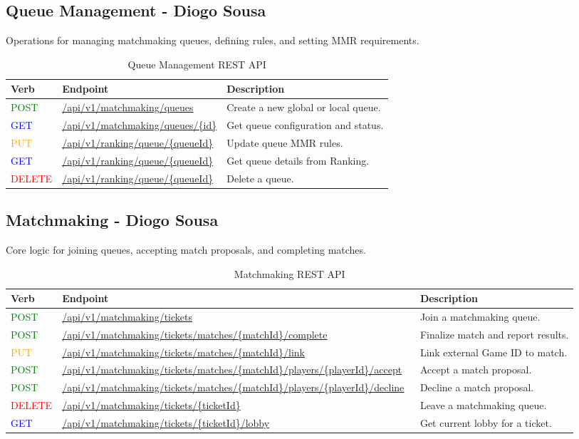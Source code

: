 \documentclass[11pt,a4paper]{article}
\newcommand{\postapi}{\textcolor{green}{POST}}
\newcommand{\getapi}{\textcolor{blue}{GET}}
\newcommand{\putapi}{\textcolor{orange}{PUT}}
\newcommand{\deleteapi}{\textcolor{red}{DELETE}}
\newcommand{\matchmaking}[1]{/api/v1/matchmaking#1}
\newcommand{\ranking}[1]{/api/v1/ranking#1}
\newcommand{\bff}[1]{\textbf{#1}}
\begin{document}
 \subsection{Queue Management - Diogo Sousa}

 Operations for managing matchmaking queues, defining rules, and setting MMR requirements.

 \begin{table}[H]
 \begin{tabular}{|p{2cm}|p{5cm}|p{7cm}|}
 \hline
 \bff{Verb} & \bff{Endpoint}     & \bff{Description} \\ \hline
 \postapi & \url{\matchmaking{/queues}}   & Create a new global or local queue. \\ \hline
 \getapi & \url{\matchmaking{/queues/{id}}} & Get queue configuration and status. \\ \hline
 \putapi & \url{\ranking{/queue/{queueId}}} & Update queue MMR rules. \\ \hline
 \getapi & \url{\ranking{/queue/{queueId}}} & Get queue details from Ranking. \\ \hline
 \deleteapi & \url{\ranking{/queue/{queueId}}} & Delete a queue. \\ \hline
 \end{tabular}
 \caption{Queue Management REST API}
 \label{tab:api-queue-management}
 \end{table}

 \subsection{Matchmaking - Diogo Sousa}

 Core logic for joining queues, accepting match proposals, and completing matches.

 \begin{table}[H]
 \begin{tabular}{|p{2cm}|p{5cm}|p{7cm}|}
 \hline
 \bff{Verb} & \bff{Endpoint}               & \bff{Description} \\ \hline
 \postapi & \url{\matchmaking{/tickets}}             & Join a matchmaking queue. \\ \hline
 \postapi & \url{\matchmaking{/tickets/matches/{matchId}/complete}}     & Finalize match and report results. \\ \hline
 \putapi & \url{\matchmaking{/tickets/matches/{matchId}/link}}      & Link external Game ID to match. \\ \hline
 \postapi & \url{\matchmaking{/tickets/matches/{matchId}/players/{playerId}/accept}}  & Accept a match proposal. \\ \hline
 \postapi & \url{\matchmaking{/tickets/matches/{matchId}/players/{playerId}/decline}} & Decline a match proposal. \\ \hline
 \deleteapi & \url{\matchmaking{/tickets/{ticketId}}}         & Leave a matchmaking queue. \\ \hline
 \getapi & \url{\matchmaking{/tickets/{ticketId}/lobby}}        & Get current lobby for a ticket. \\ \hline
 \end{tabular}
 \caption{Matchmaking REST API}
 \label{tab:api-matchmaking}
 \end{table}
\end{document}

